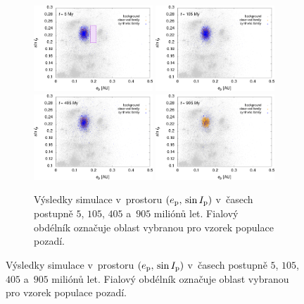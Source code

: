 \documentclass{beamer}
\newlength{\vyska}
\newlength{\vyskaB}
\newlength{\main}
\begin{document}
\begin{frame}
\begin{columns}[t]
\begin{column}{\main}
\begin{tcolorbox}[title=Výsledky\phantom{Úy},height=\vyskaB]
\begin{figure}[t]
\begin{subfigure}[t]{0.49\textwidth}
			\end{subfigure}
			\begin{subfigure}[t]{0.49\textwidth}
			\centering
			\includegraphics[width=0.49\textwidth]{../obr/ei_5t.png}
			\includegraphics[width=0.49\textwidth]{../obr/ei_105t.png}\\
			\includegraphics[width=0.49\textwidth]{../obr/ei_405t.png}
			\includegraphics[width=0.49\textwidth]{../obr/ei_905t.png}
			\caption{Výsledky simulace v~prostoru $(e_{\rm p},\,\sin I_{\rm p})$ v~časech postupně $5$, $105$, $405$ a~$905$ miliónů let. Fialový obdélník označuje oblast vybranou pro vzorek populace pozadí.} \label{fig:ei_sim}
			\end{subfigure}
		\end{figure}


\end{tcolorbox}
\end{column}
\end{columns}
\end{frame}
\end{document}
